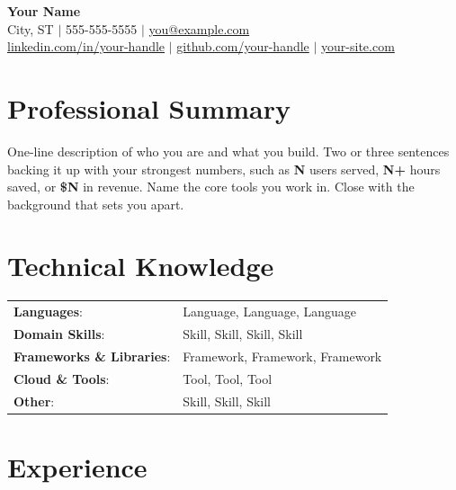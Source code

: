 \documentclass[letterpaper,10pt]{article}
\begin{document}
\begin{center}
  {\Large \textbf{Your Name}} \\ \vspace{3pt}
  \small
  City, ST $|$ 555-555-5555 $|$
  \href{mailto:you@example.com}{you@example.com} \\ \vspace{1pt}
  \href{https://www.linkedin.com/in/your-handle/}{linkedin.com/in/your-handle} $|$
  \href{https://github.com/your-handle}{github.com/your-handle} $|$
  \href{https://your-site.com}{your-site.com}
\end{center}

\section{Professional Summary}
\small
One-line description of who you are and what you build. Two or three sentences backing it
up with your strongest numbers, such as \textbf{N} users served, \textbf{N+} hours saved, or
\textbf{\$N} in revenue. Name the core tools you work in. Close with the background that sets
you apart.

\section{Technical Knowledge}
\small
\begin{tabularx}{\textwidth}{@{}>{\raggedright\arraybackslash}p{1.75in} >{\raggedright\arraybackslash}X@{}}
  \textbf{Languages}:               & Language, Language, Language \\[2pt]
  \textbf{Domain Skills}:           & Skill, Skill, Skill, Skill \\[2pt]
  \textbf{Frameworks \& Libraries}: & Framework, Framework, Framework \\[2pt]
  \textbf{Cloud \& Tools}:          & Tool, Tool, Tool \\[2pt]
  \textbf{Other}:                   & Skill, Skill, Skill \\
\end{tabularx}

\section{Experience}
\small
\end{document}
